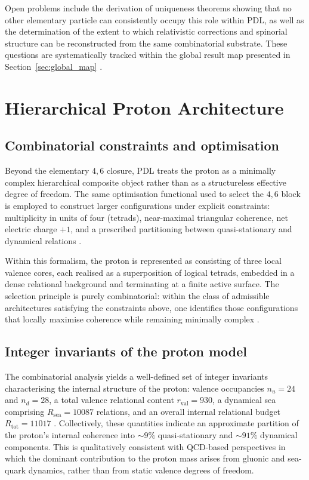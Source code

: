 \documentclass{article}
\begin{document}
Open problems include the derivation of uniqueness theorems showing that no other elementary particle can consistently occupy this role within PDL, as well as the determination of the extent to which relativistic corrections and spinorial structure can be reconstructed from the same combinatorial substrate. These questions are systematically tracked within the global result map presented in Section~\ref{sec:global_map} \citep{PDL_position}.

\section{Hierarchical Proton Architecture}
\label{sec:proton_architecture}

\subsection{Combinatorial constraints and optimisation}
\label{subsec:proton_constraints}

Beyond the elementary \(4,6\) closure, PDL treats the proton as a minimally complex hierarchical composite object rather than as a structureless effective degree of freedom. The same optimisation functional used to select the \(4,6\) block is employed to construct larger configurations under explicit constraints: multiplicity in units of four (tetrads), near-maximal triangular coherence, net electric charge \(+1\), and a prescribed partitioning between quasi-stationary and dynamical relations \citep{PDL_Main_2026,Combinatorial_Proton_v2_2026}.

Within this formalism, the proton is represented as consisting of three local valence cores, each realised as a superposition of logical tetrads, embedded in a dense relational background and terminating at a finite active surface. The selection principle is purely combinatorial: within the class of admissible architectures satisfying the constraints above, one identifies those configurations that locally maximise coherence while remaining minimally complex \citep{Combinatorial_Proton_v2_2026,PDL_intro}.

\subsection{Integer invariants of the proton model}
\label{subsec:proton_integers}

The combinatorial analysis yields a well-defined set of integer invariants characterising the internal structure of the proton: valence occupancies \(n_u = 24\) and \(n_d = 28\), a total valence relational content \(r_{\mathrm{val}} = 930\), a dynamical sea comprising \(R_{\mathrm{sea}} = 10087\) relations, and an overall internal relational budget \(R_{\mathrm{tot}} = 11017\) \citep{Combinatorial_Proton_v2_2026,PDL_intro}. Collectively, these quantities indicate an approximate partition of the proton’s internal coherence into \(\sim 9\%\) quasi-stationary and \(\sim 91\%\) dynamical components. This is qualitatively consistent with QCD-based perspectives in which the dominant contribution to the proton mass arises from gluonic and sea-quark dynamics, rather than from static valence degrees of freedom.
\end{document}
